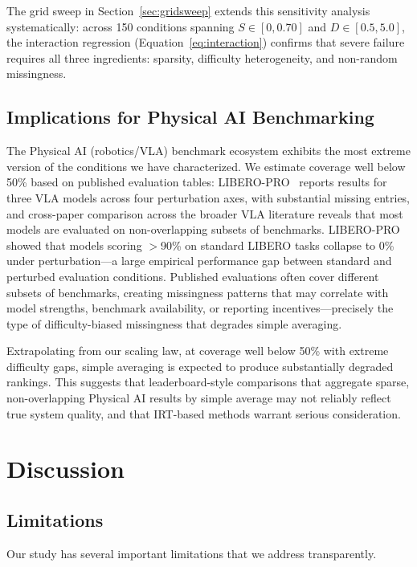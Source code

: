 \documentclass[11pt,a4paper]{article}
\begin{document}
The grid sweep in Section~\ref{sec:gridsweep} extends this sensitivity analysis systematically: across 150 conditions spanning $S \in [0, 0.70]$ and $D \in [0.5, 5.0]$, the interaction regression (Equation~\ref{eq:interaction}) confirms that severe failure requires all three ingredients: sparsity, difficulty heterogeneity, and non-random missingness.

\subsection{Implications for Physical AI Benchmarking}

The Physical AI (robotics/VLA) benchmark ecosystem exhibits the most extreme version of the conditions we have characterized. We estimate coverage well below 50\% based on published evaluation tables: LIBERO-PRO~\cite{zhou2025b} reports results for three VLA models across four perturbation axes, with substantial missing entries, and cross-paper comparison across the broader VLA literature reveals that most models are evaluated on non-overlapping subsets of benchmarks. LIBERO-PRO showed that models scoring $>$90\% on standard LIBERO tasks collapse to 0\% under perturbation---a large empirical performance gap between standard and perturbed evaluation conditions. Published evaluations often cover different subsets of benchmarks, creating missingness patterns that may correlate with model strengths, benchmark availability, or reporting incentives---precisely the type of difficulty-biased missingness that degrades simple averaging.

Extrapolating from our scaling law, at coverage well below 50\% with extreme difficulty gaps, simple averaging is expected to produce substantially degraded rankings. This suggests that leaderboard-style comparisons that aggregate sparse, non-overlapping Physical AI results by simple average may not reliably reflect true system quality, and that IRT-based methods warrant serious consideration.

\section{Discussion}

\subsection{Limitations}

Our study has several important limitations that we address transparently.
\end{document}
